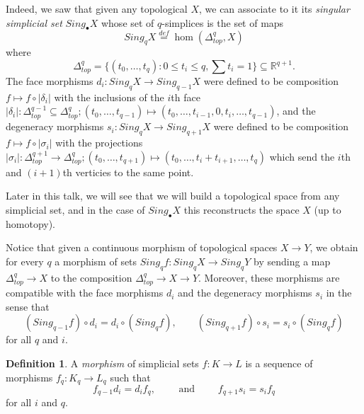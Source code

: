 \documentclass[a4paper]{amsart}
\numberwithin{figure}{section}
\theoremstyle{theorem}
\theoremstyle{definition}
\newtheorem{defi}[thm]{Definition}
\newcommand{\RR}{\mathbb{R}}
\begin{document}
Indeed, we saw that given any topological $X$, we can associate to it its \emph{singular simplicial set} $Sing_\bullet X$ whose set of $q$-simplices is the set of maps 
\[ Sing_q X \stackrel{def}{=} \hom(\Delta^q_{top}, X) \]
 where
\[ \Delta^q_{top} = \{ (t_0, \dots, t_q) : 0 \leq t_i \leq q, \sum t_i = 1 \} \subseteq \RR^{q+1}. \]
The face morphisms $d_i: Sing_q X \to Sing_{q-1} X$ were defined to be composition $f \mapsto f \circ |\delta_i|$ with the inclusions of the $i$th face $|\delta_i|: \Delta^{q-1}_{top} \subseteq \Delta_{top}^q; (t_0, \dots, t_{q-1}) \mapsto (t_0, \dots, t_{i-1}, 0, t_i, \dots, t_{q-1})$, and the degeneracy morphisms $s_i: Sing_q X \to Sing_{q+1} X$ were defined to be composition $f \mapsto f \circ |\sigma_i|$ with the projections $|\sigma_i|: \Delta^{q+1}_{top} \to \Delta_{top}^q; (t_0, \dots, t_{q+1}) \mapsto (t_0, \dots, t_i {+} t_{i+1}, \dots, t_{q})$ which send the $i$th and $(i{+}1)$th verticies to the same point.

Later in this talk, we will see that we will build a topological space from any simplicial set, and in the case of $Sing_\bullet X$ this reconstructs the space $X$ (up to homotopy).

Notice that given a continuous morphism of topological spaces $X \to Y$, we obtain for every $q$ a morphism of sets $Sing_q f: Sing_q X \to Sing_q Y$ by sending a map $\Delta^q_{top} \to X$ to the composition $\Delta^q_{top} \to X \to Y$. Moreover, these morphisms are compatible with the face morphisms $d_i$ and the degeneracy morphisms $s_i$ in the sense that 
\[ (Sing_{q-1} f) \circ d_i = d_i \circ (Sing_q f), \qquad (Sing_{q+1} f) \circ s_i = s_i \circ (Sing_q f) \]
for all $q$ and $i$. \\


\begin{mdframed}
\begin{defi}
A \emph{morphism} of simplicial sets $f: K \to L$ is a sequence of morphisms $f_q: K_q \to L_q$ such that 
\[ f_{q - 1} d_i = d_i f_q, \qquad \textrm{ and } \qquad f_{q+1}s_i = s_i f_q \]
for all $i$ and $q$. 
\end{defi}
\end{mdframed}
\end{document}
